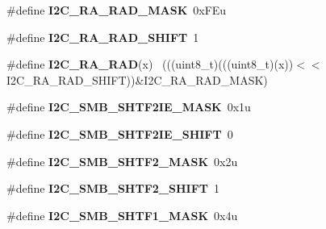 \begin{DoxyCompactItemize}
\item 
\hypertarget{group___i2_c___register___masks_gaa39c37c0d41e4cdafc00884a2fc791fa}{}\#define {\bfseries I2\+C\+\_\+\+R\+A\+\_\+\+R\+A\+D\+\_\+\+M\+A\+S\+K}~0x\+F\+Eu\label{group___i2_c___register___masks_gaa39c37c0d41e4cdafc00884a2fc791fa}

\item 
\hypertarget{group___i2_c___register___masks_ga8571ae2c33f4ea6503f568c2151ef2a9}{}\#define {\bfseries I2\+C\+\_\+\+R\+A\+\_\+\+R\+A\+D\+\_\+\+S\+H\+I\+F\+T}~1\label{group___i2_c___register___masks_ga8571ae2c33f4ea6503f568c2151ef2a9}

\item 
\hypertarget{group___i2_c___register___masks_gad21c9c4b2971ca482c5b139359216021}{}\#define {\bfseries I2\+C\+\_\+\+R\+A\+\_\+\+R\+A\+D}(x)                                                    ~(((uint8\+\_\+t)(((uint8\+\_\+t)(x))$<$$<$I2\+C\+\_\+\+R\+A\+\_\+\+R\+A\+D\+\_\+\+S\+H\+I\+F\+T))\&I2\+C\+\_\+\+R\+A\+\_\+\+R\+A\+D\+\_\+\+M\+A\+S\+K)\label{group___i2_c___register___masks_gad21c9c4b2971ca482c5b139359216021}

\item 
\hypertarget{group___i2_c___register___masks_gad123ad3f9e1362d2ee5bd403cdf34327}{}\#define {\bfseries I2\+C\+\_\+\+S\+M\+B\+\_\+\+S\+H\+T\+F2\+I\+E\+\_\+\+M\+A\+S\+K}~0x1u\label{group___i2_c___register___masks_gad123ad3f9e1362d2ee5bd403cdf34327}

\item 
\hypertarget{group___i2_c___register___masks_ga431377427b6cae03a360309ac07a4559}{}\#define {\bfseries I2\+C\+\_\+\+S\+M\+B\+\_\+\+S\+H\+T\+F2\+I\+E\+\_\+\+S\+H\+I\+F\+T}~0\label{group___i2_c___register___masks_ga431377427b6cae03a360309ac07a4559}

\item 
\hypertarget{group___i2_c___register___masks_gac393f25577923046bb7755b7f398db70}{}\#define {\bfseries I2\+C\+\_\+\+S\+M\+B\+\_\+\+S\+H\+T\+F2\+\_\+\+M\+A\+S\+K}~0x2u\label{group___i2_c___register___masks_gac393f25577923046bb7755b7f398db70}

\item 
\hypertarget{group___i2_c___register___masks_gaeaa26602cb9aabcf738aef5e95b7672c}{}\#define {\bfseries I2\+C\+\_\+\+S\+M\+B\+\_\+\+S\+H\+T\+F2\+\_\+\+S\+H\+I\+F\+T}~1\label{group___i2_c___register___masks_gaeaa26602cb9aabcf738aef5e95b7672c}

\item 
\hypertarget{group___i2_c___register___masks_gaefffa6f332bf3bd19ea55db0d1848546}{}\#define {\bfseries I2\+C\+\_\+\+S\+M\+B\+\_\+\+S\+H\+T\+F1\+\_\+\+M\+A\+S\+K}~0x4u\label{group___i2_c___register___masks_gaefffa6f332bf3bd19ea55db0d1848546}


\end{DoxyCompactItemize}
